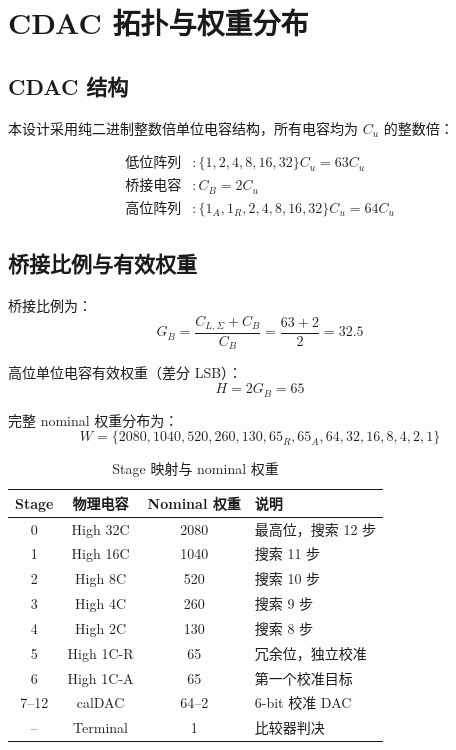 \documentclass[12pt,a4paper]{article}
\begin{document}
\section{CDAC 拓扑与权重分布}

\subsection{CDAC 结构}
本设计采用纯二进制整数倍单位电容结构，所有电容均为 $C_u$ 的整数倍：

\begin{equation}
\boxed{
\begin{aligned}
\text{低位阵列}&: \{1,2,4,8,16,32\}C_u = 63C_u \\
\text{桥接电容}&: C_B = 2C_u \\
\text{高位阵列}&: \{1_A,1_R,2,4,8,16,32\}C_u = 64C_u
\end{aligned}}
\end{equation}

\subsection{桥接比例与有效权重}
桥接比例为：
\begin{equation}
G_B = \frac{C_{L,\Sigma}+C_B}{C_B} = \frac{63+2}{2} = 32.5
\end{equation}

高位单位电容有效权重（差分 LSB）：
\begin{equation}
H = 2G_B = 65
\end{equation}

完整 nominal 权重分布为：
\begin{equation}
\boxed{
W = \{2080,1040,520,260,130,65_R,65_A,64,32,16,8,4,2,1\}
}
\end{equation}

\begin{table}[H]
\centering
\caption{Stage 映射与 nominal 权重}
\label{tab:stage_map}
\begin{tabular}{cccl}
\toprule
Stage & 物理电容 & Nominal 权重 & 说明 \\
\midrule
0 & High 32C & 2080 & 最高位，搜索 12 步 \\
1 & High 16C & 1040 & 搜索 11 步 \\
2 & High 8C  & 520  & 搜索 10 步 \\
3 & High 4C  & 260  & 搜索 9 步 \\
4 & High 2C  & 130  & 搜索 8 步 \\
5 & High 1C-R & 65  & 冗余位，独立校准 \\
6 & High 1C-A & 65  & 第一个校准目标 \\
7--12 & calDAC & 64--2 & 6-bit 校准 DAC \\
-- & Terminal & 1 & 比较器判决 \\
\bottomrule
\end{tabular}
\end{table}
\end{document}
